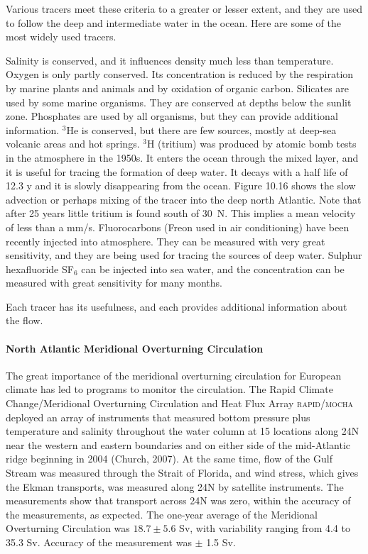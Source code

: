 Various tracers meet these criteria to a greater or lesser extent, and
they are used to follow the deep and intermediate water in the ocean. Here are
some of the most widely used tracers.
\begin{enumerate}
\vitem
Salinity is conserved, and it influences density much less than
temperature.
\vitem Oxygen is only partly conserved. Its concentration is reduced by the
respiration by marine plants and animals and by oxidation of organic carbon.
\vitem
Silicates are used by some marine organisms. They are conserved at
depths below the sunlit zone.
\vitem
Phosphates are used by all organisms, but they can provide additional
information.
\vitem
$^3$He is conserved, but there are few sources, mostly at deep-sea volcanic areas
and hot springs.
\vitem
$^3$H (tritium) was produced by atomic bomb tests in the atmosphere in the
1950s. It enters the ocean through the mixed layer, and it is useful for
tracing the formation of deep water. It decays with a half life of 12.3 y and it
is slowly disappearing from the ocean. Figure 10.16 shows the slow advection or
perhaps mixing of the tracer into the deep north Atlantic. Note
that after 25 years little tritium is found south of 30\degrees\ N. This implies a mean
velocity of less than a mm/s.
\vitem
Fluorocarbons (Freon used in air conditioning) have been recently
injected into atmosphere. They can be measured with very great sensitivity, and
they are being used for tracing the sources of deep water.
\vitem
Sulphur hexafluoride SF$_6$ can be injected into sea water, and the
concentration can be measured with great sensitivity for many months.
\end{enumerate}
Each tracer has its usefulness, and each provides additional information about
the flow.

\paragraph{North Atlantic Meridional Overturning Circulation}
The great importance of the meridional overturning circulation for European climate has led to programs to monitor the circulation. The Rapid Climate Change/Meridional Overturning Circulation and Heat Flux Array \textsc{rapid/mocha} deployed an array of instruments that measured bottom pressure plus temperature and salinity throughout the water column at 15 locations along 24\degrees N near the western and eastern boundaries and on either side of the mid-Atlantic ridge beginning in 2004 (Church, 2007). At the same time, flow of the Gulf Stream was measured through the Strait of Florida, and wind stress, which gives the Ekman transports, was measured along 24\degrees N by satellite instruments. The measurements show that transport  across 24\degrees N was zero, within the accuracy of the measurements, as expected. The one-year average of the Meridional Overturning Circulation was $18.7 \pm 5.6$ Sv, with variability ranging from 4.4 to 35.3 Sv. Accuracy of the measurement was $\pm $ 1.5 Sv. 

